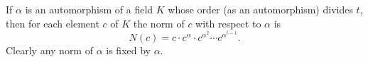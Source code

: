 If $\alpha$ is an automorphism of a field $K$ whose order (as an automorphism) divides $t$, then for each element $c$ of $K$ the norm of $c$ with respect to $\alpha$ is
$$N(c) = c \cdot c^\alpha \cdot c^{\alpha^2} \cdots c^{\alpha^{t-1}}.$$
Clearly any norm of $\alpha$ is fixed by $\alpha$.
